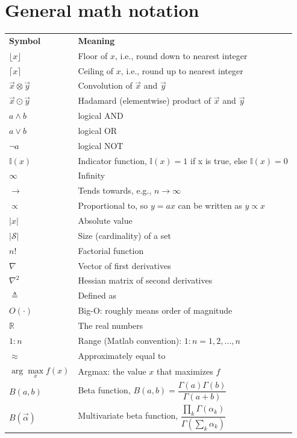 \documentclass[a4paper,11pt]{article}
\providecommand{\abs}[1]{\lvert#1\rvert}
\begin{document}
\newpage
\section*{General math notation}

\begin{longtable}{ll}
	\hline\noalign{\smallskip}
	\textbf{Symbol} & \textbf{Meaning} \\
	\noalign{\smallskip}\hline\noalign{\smallskip}
	$\lfloor x \rfloor$ & Floor of $x$, i.e., round down to nearest integer\\
	$\lceil x \rceil$ & Ceiling of $x$, i.e., round up to nearest integer\\
	$\vec{x} \otimes \vec{y}$ & Convolution of $\vec{x}$ and $\vec{y}$\\
	$\vec{x} \odot \vec{y}$ & Hadamard (elementwise) product of $\vec{x}$ and $\vec{y}$\\
	$a \wedge b$ & logical AND\\
	$a \vee b$ & logical OR\\
	$\neg a$ & logical NOT\\
	$\mathbb{I}(x)$ & Indicator function, $\mathbb{I}(x)=1$ if x is true, else $\mathbb{I}(x)=0$\\
	$\infty$ & Infinity\\
	$\rightarrow$ & Tends towards, e.g., $n \rightarrow \infty$\\
	$\propto$ &Proportional to, so $y = ax$ can be written as $y \propto x$\\
	$\abs{x}$ & Absolute value\\
	$\abs{\mathcal{S}}$ & Size (cardinality) of a set\\
	$n!$ & Factorial function\\
	$\nabla$ & Vector of first derivatives\\
	$\nabla^2$ & Hessian matrix of second derivatives\\
	$\triangleq$ & Defined as\\
	$O(\cdot)$ & Big-O: roughly means order of magnitude\\
	$\mathbb{R}$ & The real numbers\\
	$1:n$ & Range (Matlab convention): $1:n = {1, 2,...,n}$\\
	$\approx$ & Approximately equal to\\
	$\arg\max\limits_x f(x)$ & Argmax: the value $x$ that maximizes $f$\\
	$B(a,b)$ & Beta function, $B(a,b)=\dfrac{\Gamma(a)\Gamma(b)}{\Gamma(a+b)}$\\
	$B(\vec{\alpha})$ & Multivariate beta function, $\dfrac{\prod\limits_k \Gamma(\alpha_k)}{\Gamma(\sum\limits_k \alpha_k)}$\\

\end{longtable}
\end{document}
